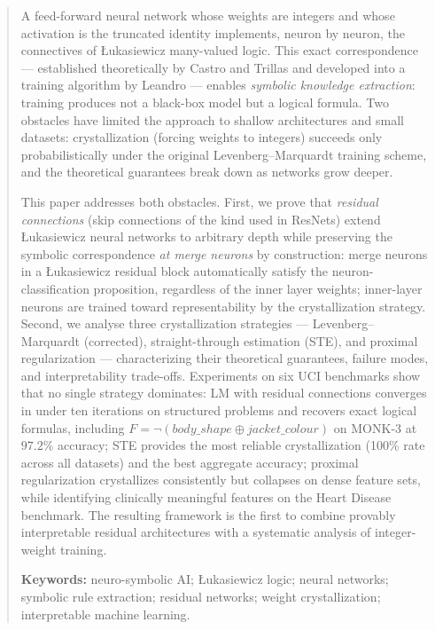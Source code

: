 \documentclass[12pt,a4paper]{article}
\begin{document}
\begin{abstract}
A feed-forward neural network whose weights are integers and whose activation
is the truncated identity implements, neuron by neuron, the connectives of
\L{}ukasiewicz many-valued logic.
This exact correspondence --- established theoretically by Castro and Trillas
and developed into a training algorithm by Leandro --- enables \emph{symbolic
knowledge extraction}: training produces not a black-box model but a logical
formula.
Two obstacles have limited the approach to shallow architectures and small
datasets: crystallization (forcing weights to integers) succeeds only
probabilistically under the original Levenberg--Marquardt training scheme,
and the theoretical guarantees break down as networks grow deeper.

This paper addresses both obstacles.
First, we prove that \emph{residual connections} (skip connections of the kind
used in ResNets) extend \L{}ukasiewicz neural networks to arbitrary depth while
preserving the symbolic correspondence \emph{at merge neurons} by
construction: merge neurons in a \L{}ukasiewicz residual block automatically
satisfy the neuron-classification proposition, regardless of the inner layer
weights; inner-layer neurons are trained toward representability by the
crystallization strategy.
Second, we analyse three crystallization strategies --- Levenberg--Marquardt
(corrected), straight-through estimation (STE), and proximal regularization ---
characterizing their theoretical guarantees, failure modes, and
interpretability trade-offs.
Experiments on six UCI benchmarks show that no single strategy dominates:
LM with residual connections converges in under ten iterations on structured
problems and recovers exact logical formulas, including
$F = \neg(\mathit{body\_shape} \oplus \mathit{jacket\_colour})$ on MONK-3 at
$97.2\%$ accuracy; STE provides the most reliable crystallization (100\% rate
across all datasets) and the best aggregate accuracy; proximal regularization
crystallizes consistently but collapses on dense feature sets, while
identifying clinically meaningful features on the Heart Disease benchmark.
The resulting framework is the first to combine provably interpretable residual
architectures with a systematic analysis of integer-weight training.

\noindent\textbf{Keywords:} neuro-symbolic AI; \L{}ukasiewicz logic; neural networks;
symbolic rule extraction; residual networks; weight crystallization; interpretable
machine learning.
\end{abstract}
\end{document}

